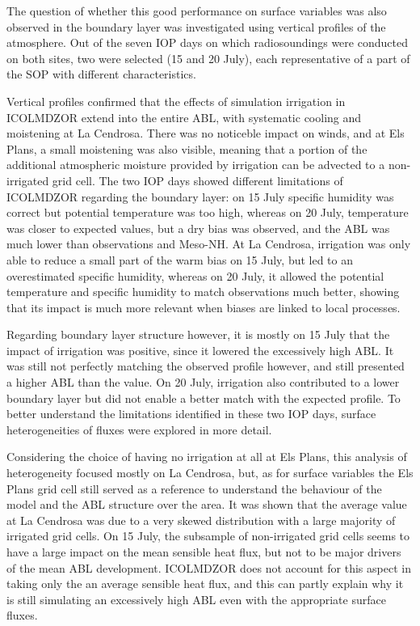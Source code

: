 \hfill

The question of whether this good performance on surface variables was also observed in the boundary layer was investigated using vertical profiles of the atmosphere. Out of the seven IOP days on which radiosoundings were conducted on both sites, two were selected (15 and 20 July), each representative of a part of the SOP with different characteristics.

Vertical profiles confirmed that the effects of simulation irrigation in ICOLMDZOR extend into the entire ABL, with systematic cooling and moistening at La Cendrosa. There was no noticeble impact on winds, and at Els Plans, a small moistening was also visible, meaning that a portion of the additional atmospheric moisture provided by irrigation can be advected to a non-irrigated grid cell.
The two IOP days showed different limitations of ICOLMDZOR regarding the boundary layer: on 15 July specific humidity was correct but potential temperature was too high, whereas on 20 July, temperature was closer to expected values, but a dry bias was observed, and the ABL was much lower than observations and Meso-NH.
At La Cendrosa, \irrboost irrigation was only able to reduce a small part of the warm bias on 15 July, but led to an overestimated specific humidity, whereas on 20 July, it allowed the potential temperature and specific humidity to match observations much better, showing that its impact is much more relevant when biases are linked to local processes.

Regarding boundary layer structure however, it is mostly on 15 July that the impact of irrigation was positive, since it lowered the excessively high ABL. It was still not perfectly matching the observed profile however, and still presented a higher ABL than the \mesomean value. 
On 20 July, irrigation also contributed to a lower boundary layer but did not enable a better match with the expected profile. 
To better understand the limitations identified in these two IOP days, surface heterogeneities of fluxes were explored in more detail.

\hfill

Considering the choice of having no irrigation at all at Els Plans, this analysis of heterogeneity focused mostly on La Cendrosa, but, as for surface variables the Els Plans grid cell still served as a reference to understand the behaviour of the model and the ABL structure over the area.
It was shown that the \mesomean average value at La Cendrosa was due to a very skewed distribution with a large majority of irrigated grid cells. 
On 15 July, the subsample of non-irrigated grid cells seems to have a large impact on the mean sensible heat flux, but not to be major drivers of the mean ABL development. ICOLMDZOR does not account for this aspect in taking only the an average sensible heat flux, and this can partly explain why it is still simulating an excessively high ABL even with the appropriate surface fluxes.

